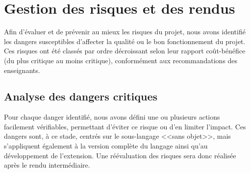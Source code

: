 \section{Gestion des risques et des rendus}

\noindent
Afin d'évaluer et de prévenir au mieux les risques du projet, nous avons identifié les dangers susceptibles d'affecter la qualité ou le bon fonctionnement du projet. Ces risques ont été classés par ordre décroissant selon leur rapport coût-bénéfice (du plus critique au moins critique), conformément aux recommandations des enseignants.


\subsection{Analyse des dangers critiques}
\noindent
Pour chaque danger identifié, nous avons défini une ou plusieurs actions facilement vérifiables, permettant d'éviter ce risque ou d'en limiter l'impact. Ces dangers sont, à ce stade, centrés sur le sous-langage <<sans objet>>, mais s'appliquent également à la version complète du langage ainsi qu'au développement de l'extension. Une réévaluation des risques sera donc réalisée après le rendu
intermédiaire.


